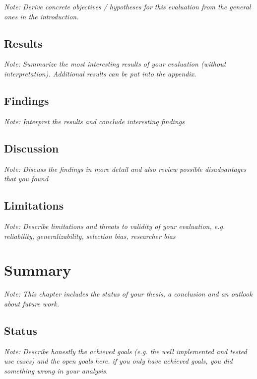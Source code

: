 \documentclass[a4paper,12pt,twoside]{report}
\begin{document}
\textit{Note: Derive concrete objectives / hypotheses for this evaluation from the general ones in the introduction.}

\section{Results}

\textit{Note: Summarize the most interesting results of your evaluation (without interpretation). Additional results can be put into the appendix.}

\section{Findings}

\textit{Note: Interpret the results and conclude interesting findings}

\section{Discussion}

\textit{Note: Discuss the findings in more detail and also review possible disadvantages that you found}

\section{Limitations}

\textit{Note: Describe limitations and threats to validity of your evaluation, e.g. reliability, generalizability, selection bias, researcher bias}












\chapter{Summary}

\textit{Note: This chapter includes the status of your thesis, a conclusion and an outlook about future work.}

\section{Status}

\textit{Note: Describe honestly the achieved goals (e.g. the well implemented and tested use cases) and the open goals here. if you only have achieved goals, you did something wrong in your analysis.}
\end{document}
